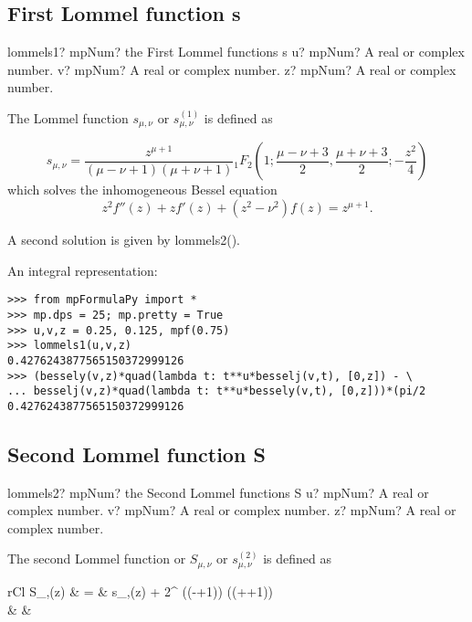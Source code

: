 \subsection{First Lommel function s}

\begin{mpFunctionsExtract}
	\mpFunctionThree
	{lommels1? mpNum? the First Lommel functions s}
	{u? mpNum? A real or complex number.}
	{v? mpNum? A real or complex number.}
	{z? mpNum? A real or complex number.}		
\end{mpFunctionsExtract}


\vpara
The Lommel function $s_{\mu,\nu}$ or $s_{\mu,\nu}^{(1)}$ is defined as

\begin{equation}
s_{\mu,\nu}= \frac{z^{\mu+1}}{(\mu-\nu+1)(\mu+\nu+1)}{}_1F_2\left(1; \frac{\mu-\nu+3}{2}, \frac{\mu+\nu+3}{2};-\frac{z^2}{4}\right)
\end{equation}
which solves the inhomogeneous Bessel equation
\begin{equation}
z^2 f''(z)+z f'(z) + \left(z^2-\nu^2\right)f(z) = z^{\mu+1}.
\end{equation}

A second solution is given by lommels2().

An integral representation:

\begin{lstlisting}
>>> from mpFormulaPy import *
>>> mp.dps = 25; mp.pretty = True
>>> u,v,z = 0.25, 0.125, mpf(0.75)
>>> lommels1(u,v,z)
0.4276243877565150372999126
>>> (bessely(v,z)*quad(lambda t: t**u*besselj(v,t), [0,z]) - \
... besselj(v,z)*quad(lambda t: t**u*bessely(v,t), [0,z]))*(pi/2
0.4276243877565150372999126
\end{lstlisting}




\subsection{Second Lommel function S}

\begin{mpFunctionsExtract}
	\mpFunctionThree
	{lommels2? mpNum? the Second Lommel functions S}
	{u? mpNum? A real or complex number.}
	{v? mpNum? A real or complex number.}
	{z? mpNum? A real or complex number.}		
\end{mpFunctionsExtract}


\vpara
The second Lommel function or $S_{\mu,\nu}$ or $s_{\mu,\nu}^{(2)}$ is defined as
\begin{IEEEeqnarray}{rCl} 
S_{\mu,\nu}(z) & = & s_{\mu,\nu}(z) + 2^{} \Gamma\left((\mu-\nu+1)\right) \Gamma\left((\mu+\nu+1)\right)  \\ \nonumber
& \times & \left[\sin\left(\tfrac{1}{2}(\mu-\nu)\pi\right)J_{\nu}(z)- \cos\left(\tfrac{1}{2}(\mu-\nu)\pi\right)Y_{\nu}(z)- \right]
\end{IEEEeqnarray}


